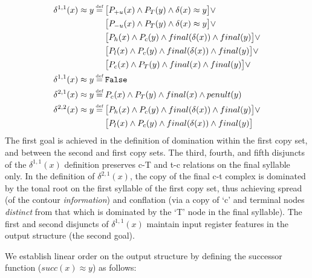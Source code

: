 \documentclass{article}
\newcommand\myeq{\mathrel{\stackrel{\makebox[0pt]{\mbox{\normalfont\tiny def}}}{=}}}
\newcommand{\ap}{\approx}
\begin{document}
\begin{equation}
\begin{aligned}
\delta^{1,1}(x)\ap y&\myeq \big[ P_{+u}(x)\land P_{T}(y)\land\delta(x)\ap y\big]\lor \\
&\quad \, \, \big[ P_{-u}(x)\land P_{T}(y)\land\delta(x)\ap y\big]\lor \\
&\quad \, \, \big[ P_{h}(x)\land P_{c}(y)\land final(\delta(x))\land final(y)\big]\lor \\
&\quad \, \, \big[ P_{l}(x)\land P_{c}(y)\land final(\delta(x))\land final(y)\big]\lor \\
&\quad \, \, \big[ P_{c}(x)\land P_{T}(y)\land final(x)\land final(y)\big]\lor \\
\delta^{1,1}(x)\ap y&\myeq\mathtt{False}\\
\delta^{2,1}(x)\ap y&\myeq P_{c}(x)\land P_{T}(y)\land final(x)\land penult(y) \\
\delta^{2,2}(x)\ap y&\myeq \big[ P_{h}(x)\land P_{c}(y)\land final(\delta(x))\land final(y)\big]\lor \\
&\quad \, \, \big[ P_{l}(x)\land P_{c}(y) \land final(\delta(x))\land final(y)\big] \\
\end{aligned}
\end{equation}
The first goal is achieved in the definition of domination within the first copy set, and between the second and first copy sets. The third, fourth, and fifth disjuncts of the $\delta^{1,1}(x)$ definition preserves c-T and t-c relations on the final syllable only. In the definition of $\delta^{2,1}(x)$, the copy of the final c-t complex is dominated by the tonal root on the first syllable of the first copy set, thus achieving spread (of the contour \emph{information}) and conflation (via a copy of `c' and terminal nodes \emph{distinct} from that which is dominated by the `T' node in the final syllable). The first and second disjuncts of $\delta^{1,1}(x)$ maintain input register features in the output structure (the second goal).\par
We establish linear order on the output structure by defining the successor function ($succ(x)\ap y$) as follows:
\end{document}
